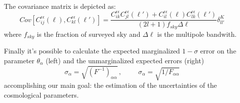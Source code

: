 \begin{frame}[t]
\begin{columns}[t]

\begin{column}{.03\textwidth}\end{column} %

\begin{column}{.465\textwidth} %
\vspace{10}\\

The covariance matrix is depicted as: $$Cov[C_{ij}^{\epsilon\epsilon}(\ell), C_{kl}^{\epsilon\epsilon}(\ell')]=\frac{C_{ik}^{\epsilon\epsilon} C_{jl}^{\epsilon\epsilon}(\ell') + C_{il}^{\epsilon\epsilon}(\ell)C_{lk}^{\epsilon\epsilon}(\ell')}{(2l+1)f_{sky}\Delta \ell}\delta_{ll'}^K$$ where $f_{sky}$ is the fraction of surveyed sky and $\Delta \ell $ is the multipole bandwith.


 Finally it's possible to calculate the expected marginalized $1-\sigma$ error on the parameter $\theta_\alpha$ (left) and the unmarginalized expected errors (right)
$$\sigma_\alpha = \sqrt{(F^{-1})_{\alpha\alpha}}\,, \hspace{1cm} \sigma_\alpha =  \sqrt{1/F_{\alpha\alpha}}$$ accomplishing our main goal: the estimation of the uncertainties of the cosmological parameters.
%


\end{column}
\end{columns}
\end{frame}
